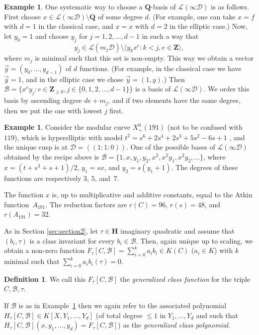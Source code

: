 \documentclass{amsart}
\newcommand{\QQ}{\mathbf{Q}}
\newcommand{\HH}{\mathbf{H}}
\newcommand{\ZZ}{\mathbf{Z}}
\newcommand{\calL}{\mathcal{L}}
\newcommand{\D}{\mathcal{D}}
\newcommand{\mc}{\mathcal}
\newcommand{\xplus}[1]{X^0_+(#1)}
\numberwithin{equation}{section}
\theoremstyle{definition}
\newtheorem{definition}[equation]{Definition}
\newtheorem{example}[equation]{Example}
\begin{document}
\begin{example}\label{example:constructbasis}
    One systematic way to choose a $\QQ$-basis of $\calL(\infty\D)$ is as follows.
	First choose $x\in \calL(\infty \D)\setminus\QQ$ of some degree $d$.
	(For example, one can take $x=f$ with $d=1$ in the classical case, and $x=x$ with $d=2$ in the elliptic case.) Now, let $y_0 = 1$ and 
		choose $y_j$ for $j = 1,2,\ldots, d-1$ in such a way
		that $$y_j \in \calL(m_j \D)\setminus\langle y_k x^e : k < j, e\in\ZZ\rangle,$$
		where $m_j$ is minimal such that this set is non-empty.
		This way we obtain a vector $\vec{y} = (y_0,\ldots, y_{d-1})$ of $d$ functions. (For example, in the classical case we have $\vec{y}=1$, and in the elliptic case we chose $\vec{y} =(1,y)$.) Then $\mc{B}=\{x^e y_j : e\in\ZZ_{\geq 0}, j\in\{0,1,2,\ldots,d-1\}\}$
is a basis of $\mathcal{L}(\infty\D)$.
We order this basis by ascending degree $de+m_j$,
and if two elements have the same degree, then we put the
one with lowest $j$ first.

\end{example}
	
	\begin{example}\label{example:hyperelliptic}
		Consider the modular curve $\xplus{191}$ (not to be confused with~$119$),
		which is hyperelliptic with model
		$t^2 = s^6+2s^4+2s^3+5s^2-6s+1$ \cite[Table~3]{galbraiththesis1996},
		and the unique cusp is at $\mc{D}=((1:1:0))$.
		One of the possible bases of $\mc{L}(\infty\mc{D})$ obtained by the recipe above is $\mc{B}=\{1,x,y_1,y_2,x^2,x^2y_1,x^2y_2,\ldots\}$, where $x=(t+s^3+s+1)/2$,  $y_1=sx$, and $y_2=s(y_1+1)$.
		The degrees of these functions are respectively $3$, $5$, and~$7$.

The function $x$ is, up to multiplicative and additive constants, equal to the Atkin function~$A_{191}$.
The reduction factors are $r(C) = 96$, $r(s) = 48$, and $r(A_{191}) = 32$.
	\end{example}

As in Section \ref{sec:section2}, let $\tau\in\HH$
imaginary quadratic and assume that $(b_i,\tau)$
is a class invariant for every $b_i\in\mc{B}$.
Then, again unique up to scaling, we obtain a non-zero
function $F_{\tau}[C,\mc{B}]=\sum_{i=0}^k a_ib_i\in K(C)$ 
($a_i\in K$) with $k$ minimal such that $\sum_{i=0}^k a_ib_i(\tau)=0$.
\begin{definition}\label{def:genclasspoly2}
We call this $F_{\tau}[C,\mc{B}]$ the \emph{generalized class function}
for the triple $C,\mc{B},\tau$.

If $\mc{B}$ is as in Example~\ref{example:constructbasis}
then we again refer to the associated polynomial
$H_{\tau}[C,\mc{B}]\in K[X,Y_1,\ldots,Y_d]$
(of total degree $\leq 1$ in $Y_1,\ldots, Y_d$ and
such that $H_{\tau}[C,\mc{B}](x,y_1,\ldots, y_d) =
F_{\tau}[C,\mc{B}]$)
as the \emph{generalized class polynomial}. 
\end{definition}
\end{document}
